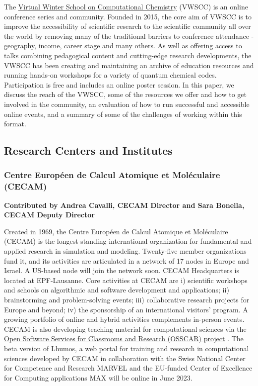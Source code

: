 \documentclass[9pt,review]{livecoms}
\begin{document}
The \href{https://winterschool.cc}{Virtual Winter School on Computational Chemistry} (VWSCC) is an online conference series and community. Founded in 2015, the core aim of VWSCC is to improve the accessibility of scientific research to the scientific community all over the world by removing many of the traditional barriers to conference attendance - geography, income, career stage and many others. As well as offering access to talks combining pedagogical content and cutting-edge research developments, the VWSCC has been creating and maintaining an archive of education resources and running hands-on workshops for a variety of quantum chemical codes.  Participation is free and includes an online poster session. In this paper\cite{ROOS2020112975}, we discuss the reach of the VWSCC, some of the resources we offer and how to get involved in the community, an evaluation of how to run successful and accessible online events, and a summary of some of the challenges of working within this format.



\subsection{Research Centers and Institutes}

\subsubsection{Centre Européen de Calcul Atomique et Moléculaire (CECAM)}

\textbf{Contributed by Andrea Cavalli, CECAM Director and Sara Bonella, CECAM Deputy Director}

Created in 1969, the Centre Européen de Calcul Atomique et Moléculaire (CECAM) is the longest-standing international organization for fundamental and applied research in simulation and modeling. 
Twenty-five member organizations fund it, and its activities are articulated in a network of 17 nodes in Europe and Israel. 
A US-based node will join the network soon. 
CECAM Headquarters is located at EPF-Lausanne. 
Core activities at CECAM are i) scientific workshops and schools on algorithmic and software development and applications; ii) brainstorming and problem-solving events; iii) collaborative research projects for Europe and beyond; iv) the sponsorship of an international visitors’ program. 
A growing portfolio of online and hybrid activities complements in-person events. 
CECAM is also developing teaching material for computational sciences via the \href{https://www.osscar.org/}{Open Software Services for Classrooms and Research (OSSCAR) project} \cite{DU2023}. 
The beta version of Lhumos, a web portal for training and research in computational sciences developed by CECAM in collaboration with the Swiss National Center for Competence and Research MARVEL and the EU-funded Center of Excellence for Computing applications MAX will be online in June 2023.
 
\end{document}
